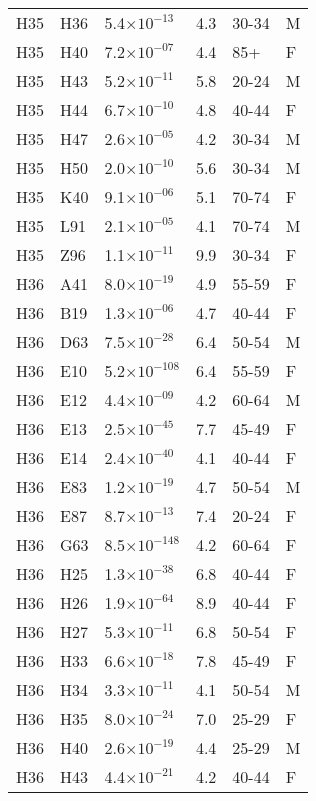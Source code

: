 \begin{longtable}{lllrll}
   H35 & H36 & 5.4$\times10^{-13}$ & 4.3 & 30-34 & M \\ 
   H35 & H40 & 7.2$\times10^{-07}$ & 4.4 & 85+ & F \\ 
   H35 & H43 & 5.2$\times10^{-11}$ & 5.8 & 20-24 & M \\ 
   H35 & H44 & 6.7$\times10^{-10}$ & 4.8 & 40-44 & F \\ 
   H35 & H47 & 2.6$\times10^{-05}$ & 4.2 & 30-34 & M \\ 
   H35 & H50 & 2.0$\times10^{-10}$ & 5.6 & 30-34 & M \\ 
   H35 & K40 & 9.1$\times10^{-06}$ & 5.1 & 70-74 & F \\ 
   H35 & L91 & 2.1$\times10^{-05}$ & 4.1 & 70-74 & M \\ 
   H35 & Z96 & 1.1$\times10^{-11}$ & 9.9 & 30-34 & F \\ 
   H36 & A41 & 8.0$\times10^{-19}$ & 4.9 & 55-59 & F \\ 
   H36 & B19 & 1.3$\times10^{-06}$ & 4.7 & 40-44 & F \\ 
   H36 & D63 & 7.5$\times10^{-28}$ & 6.4 & 50-54 & M \\ 
   H36 & E10 & 5.2$\times10^{-108}$ & 6.4 & 55-59 & F \\ 
   H36 & E12 & 4.4$\times10^{-09}$ & 4.2 & 60-64 & M \\ 
   H36 & E13 & 2.5$\times10^{-45}$ & 7.7 & 45-49 & F \\ 
   H36 & E14 & 2.4$\times10^{-40}$ & 4.1 & 40-44 & F \\ 
   H36 & E83 & 1.2$\times10^{-19}$ & 4.7 & 50-54 & M \\ 
   H36 & E87 & 8.7$\times10^{-13}$ & 7.4 & 20-24 & F \\ 
   H36 & G63 & 8.5$\times10^{-148}$ & 4.2 & 60-64 & F \\ 
   H36 & H25 & 1.3$\times10^{-38}$ & 6.8 & 40-44 & F \\ 
   H36 & H26 & 1.9$\times10^{-64}$ & 8.9 & 40-44 & F \\ 
   H36 & H27 & 5.3$\times10^{-11}$ & 6.8 & 50-54 & F \\ 
   H36 & H33 & 6.6$\times10^{-18}$ & 7.8 & 45-49 & F \\ 
   H36 & H34 & 3.3$\times10^{-11}$ & 4.1 & 50-54 & M \\ 
   H36 & H35 & 8.0$\times10^{-24}$ & 7.0 & 25-29 & F \\ 
   H36 & H40 & 2.6$\times10^{-19}$ & 4.4 & 25-29 & M \\ 
   H36 & H43 & 4.4$\times10^{-21}$ & 4.2 & 40-44 & F \\ 

\end{longtable}
